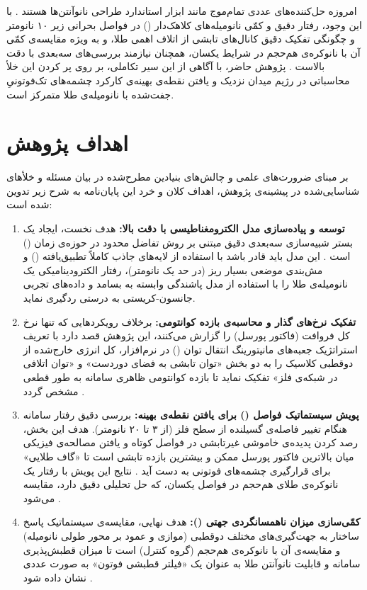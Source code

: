 \documentclass[12pt,a4paper]{report}
\begin{document}
امروزه حل‌کننده‌های عددی تمام‌موج مانند  ابزار استاندارد طراحی نانوآنتن‌ها هستند \cite{taflove}. با این وجود، رفتار دقیق و کمّی نانومیله‌های کلاهک‌دار () در فواصل بحرانی زیر ۱۰ نانومتر و چگونگی تفکیک دقیق کانال‌های تابشی از اتلاف اهمی طلا، و به ویژه مقایسه‌ی کمّی آن با نانوکره‌ی هم‌حجم در شرایط یکسان، همچنان نیازمند بررسی‌های سه‌بعدی با دقت بالاست \cite{novotny,maier}. پژوهش حاضر، با آگاهی از این سیر تکاملی، بر روی پر کردن این خلأ محاسباتی در رژیم میدان نزدیک و یافتن نقطه‌ی بهینه‌ی کارکرد چشمه‌های تک‌فوتونیِ جفت‌شده با نانومیله‌ی طلا متمرکز است.

\section{اهداف پژوهش}
بر مبنای ضرورت‌های علمی و چالش‌های بنیادین مطرح‌شده در بیان مسئله و خلأهای شناسایی‌شده در پیشینه‌ی پژوهش، اهداف کلان و خرد این پایان‌نامه به شرح زیر تدوین شده است:

\begin{enumerate}
\item \textbf{توسعه و پیاده‌سازی مدل الکترومغناطیسی با دقت بالا:} هدف نخست، ایجاد یک بستر شبیه‌سازی سه‌بعدی دقیق مبتنی بر روش تفاضل محدود در حوزه‌ی زمان () است \cite{taflove}. این مدل باید قادر باشد با استفاده از لایه‌های جاذب کاملاً تطبیق‌یافته () \cite{berenger} و مش‌بندی موضعی بسیار ریز (در حد یک نانومتر)، رفتار الکترودینامیکی یک نانومیله‌ی طلا را با استفاده از مدل پاشندگی وابسته به بسامد \cite{maier} و داده‌های تجربی جانسون-کریستی \cite{jc} به درستی ردگیری نماید.

\item \textbf{تفکیک نرخ‌های گذار و محاسبه‌ی بازده کوانتومی:} برخلاف رویکردهایی که تنها نرخ کل فروافت (فاکتور پورسل) را گزارش می‌کنند، این پژوهش قصد دارد با تعریف استراتژیک جعبه‌های مانیتورینگ انتقال توان () در نرم‌افزار، کل انرژی خارج‌شده از دوقطبی کلاسیک را به دو بخش «توان تابشی به فضای دوردست» و «توان اتلافی در شبکه‌ی فلز» تفکیک نماید تا بازده کوانتومی ظاهری سامانه به طور قطعی مشخص گردد \cite{novotny,koenderink}.

\item \textbf{پویش سیستماتیک فواصل () برای یافتن نقطه‌ی بهینه:} بررسی دقیق رفتار سامانه هنگام تغییر فاصله‌ی گسیلنده از سطح فلز (از ۳ تا ۲۰ نانومتر). هدف این بخش، رصد کردن پدیده‌ی خاموشی غیرتابشی در فواصل کوتاه و یافتن مصالحه‌ی فیزیکی میان بالاترین فاکتور پورسل ممکن و بیشترین بازده تابشی است تا «گاف طلایی» برای قرارگیری چشمه‌های فوتونی به دست آید \cite{novotny,anger}. نتایج این پویش با رفتار یک نانوکره‌ی طلای هم‌حجم در فواصل یکسان، که حل تحلیلی دقیق دارد، مقایسه می‌شود \cite{ruppin,gersten}.

\item \textbf{کمّی‌سازی میزان ناهمسانگردی جهتی ():} هدف نهایی، مقایسه‌ی سیستماتیک پاسخ ساختار به جهت‌گیری‌های مختلف دوقطبی (موازی و عمود بر محور طولی نانومیله) و مقایسه‌ی آن با نانوکره‌ی هم‌حجم (گروه کنترل) است تا میزان قطبش‌پذیری سامانه و قابلیت نانوآنتن طلا به عنوان یک «فیلتر قطبشی فوتون» به صورت عددی نشان داده شود \cite{novotny,maier}.
\end{enumerate}
\end{document}
